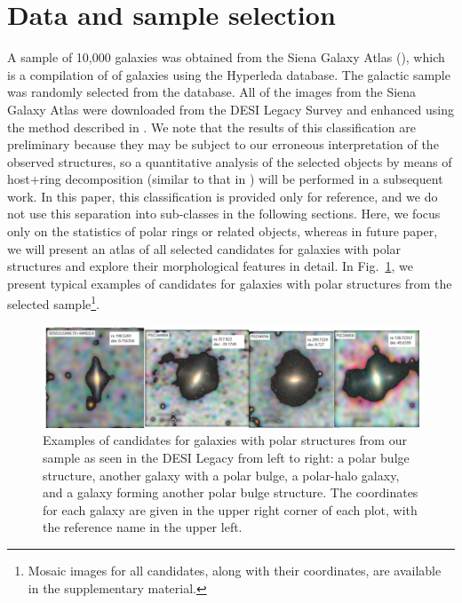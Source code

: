 \documentclass[letter]{aa}
\begin{document}
\section{Data and sample selection}
\label{sec:data}
A sample of 10,000 galaxies was obtained from the Siena Galaxy Atlas (\cite{siena}), which is a compilation of of galaxies using the Hyperleda database. The galactic sample was randomly selected from the database. All of the images from the Siena Galaxy Atlas were downloaded from the DESI Legacy Survey and enhanced using the method described in \citet{2024AstL...}. We note that the results of this classification are preliminary because they may be subject to our erroneous interpretation of the observed structures, so a quantitative analysis of the selected objects by means of host+ring decomposition (similar to that in \citealt{mosenkov2022unveiling}) will be performed in a subsequent work. In this paper, this classification is provided only for reference, and we do not use this separation into sub-classes in the following sections. 
Here, we focus only on the statistics of polar rings or related objects, whereas in future paper, we will present an atlas of all selected candidates for galaxies with polar structures and explore their morphological features in detail. In Fig.~\ref{fig:examples}, we present typical examples of candidates for galaxies with polar structures from the selected sample\footnote{Mosaic images for all candidates, along with their coordinates, are available in the supplementary material.}.


\begin{figure}
    \centering
    \includegraphics[width = .87\paperwidth]{Images/myimages.png}
    \caption{Examples of candidates for galaxies with polar structures from our sample as seen in the DESI Legacy from left to right: a polar bulge structure, another galaxy with a polar bulge, a polar-halo galaxy, and a galaxy forming another polar bulge structure. The coordinates for each galaxy are given in the upper right corner of each plot, with the reference name in the upper left. }
    \label{fig:examples}
\end{figure}
\end{document}
